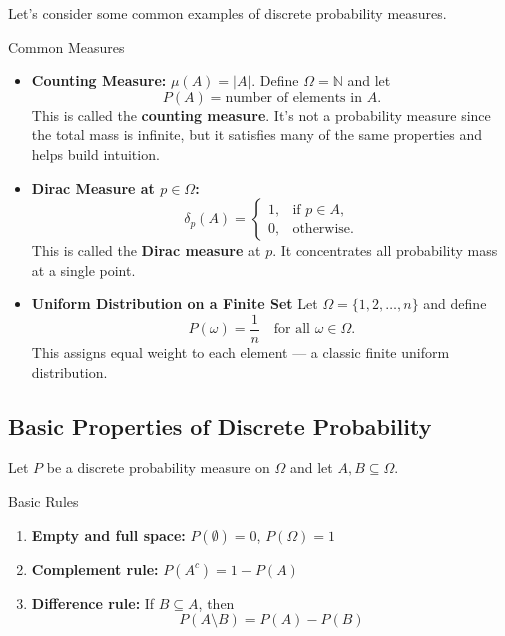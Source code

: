 Let’s consider some common examples of discrete probability measures.

\begin{eg}{Common Measures}
\begin{itemize}
    \item \textbf{Counting Measure:} \(\mu(A) = |A|\).
    Define $\Omega = \mathbb{N}$ and let
	\[
	P(A) = \text{number of elements in } A.
	\]
	This is called the \textbf{counting measure}. It’s not a probability measure since the total mass is infinite, but it satisfies many of the same properties and helps build intuition.
    \item \textbf{Dirac Measure at \(p \in \Omega\):}
    \[
    \delta_p(A) = 
    \begin{cases} 
    1, & \text{if } p \in A, \\
    0, & \text{otherwise}.
    \end{cases}
    \]
    This is called the \textbf{Dirac measure} at $p$. It concentrates all probability mass at a single point.
    
	\item \textbf{Uniform Distribution on a Finite Set}
	Let $\Omega = \{1, 2, \dots, n\}$ and define
	\[
	P(\omega) = \frac{1}{n} \quad \text{for all } \omega \in \Omega.
	\]
	This assigns equal weight to each element — a classic finite uniform distribution.
\end{itemize}
\end{eg}

\subsection{Basic Properties of Discrete Probability}

Let $P$ be a discrete probability measure on $\Omega$ and let $A, B \subseteq \Omega$.

\begin{prop}{Basic Rules}
\begin{enumerate}
    \item \textbf{Empty and full space:} \( P(\emptyset) = 0 \), \quad \( P(\Omega) = 1 \)
    
    \item \textbf{Complement rule:} \( P(A^c) = 1 - P(A) \)
    \item \textbf{Difference rule:} If \( B \subseteq A \), then
    \[
    P(A \setminus B) = P(A) - P(B)
    \]
\end{enumerate}
\end{prop}

